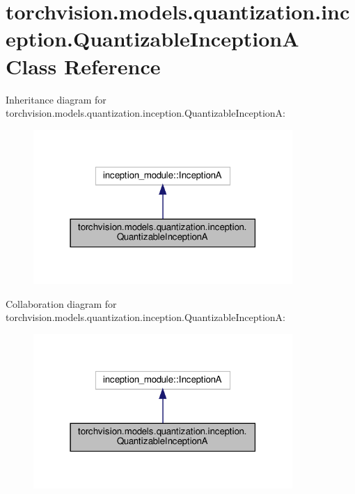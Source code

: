\hypertarget{classtorchvision_1_1models_1_1quantization_1_1inception_1_1QuantizableInceptionA}{}\section{torchvision.\+models.\+quantization.\+inception.\+Quantizable\+InceptionA Class Reference}
\label{classtorchvision_1_1models_1_1quantization_1_1inception_1_1QuantizableInceptionA}


Inheritance diagram for torchvision.\+models.\+quantization.\+inception.\+Quantizable\+InceptionA\+:
\nopagebreak
\begin{figure}[H]
\begin{center}
\leavevmode
\includegraphics[width=279pt]{classtorchvision_1_1models_1_1quantization_1_1inception_1_1QuantizableInceptionA__inherit__graph}
\end{center}
\end{figure}


Collaboration diagram for torchvision.\+models.\+quantization.\+inception.\+Quantizable\+InceptionA\+:
\nopagebreak
\begin{figure}[H]
\begin{center}
\leavevmode
\includegraphics[width=279pt]{classtorchvision_1_1models_1_1quantization_1_1inception_1_1QuantizableInceptionA__coll__graph}
\end{center}
\end{figure}
